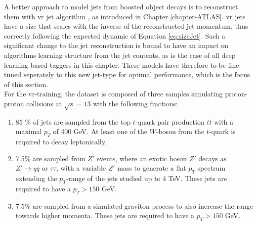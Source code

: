 A better approach to model jets from boosted object decays is to reconstruct them with \gls{vr} jet algorithm \cite{vrJetPaper}, as introduced in Chapter \ref{chapter-ATLAS}.  %
\gls{vr} jets have a size that scales with the inverse of the reconstructed jet momentum, thus correctly following the expected dynamic of Equation \ref{eq:sizeJet}. Such a significant change to the jet reconstruction is bound to have an impact on algorithms learning structure from the jet contents, as is the case of all deep learning-based taggers in this chapter. These models have therefore to be fine-tuned seperately to this new jet-type for optimal performance, which is the focus of this section. \\

For the \gls{vr}-training, the dataset is composed of three samples simulating proton-proton collisions at $\sqrt{s} = 13$ with the following fractions:
\begin{enumerate}
  \item 85 \% of jets are sampled from the top $t$-quark pair production $t\bar{t}$ with a maximal $p_T$ of 400 GeV. At least one of the $W$-boson from the $t$-quark is required to decay leptonically.
  \item 7.5\% are sampled from $Z'$ events, where an exotic boson $Z'$ decays as $Z' \rightarrow q\bar{q} \textrm{ or } \tau \bar{\tau}$, with a variable $Z'$ mass to generate a flat $p_T$ spectrum extending the $p_T$-range of the jets studied up to 4 TeV. These jets are required to have a $p_T > 150$ GeV.
  \item 7.5\% are sampled from a simulated graviton process to also increase the range towards higher momenta. These jets are required to have a $p_T > 150$ GeV.
\end{enumerate}

